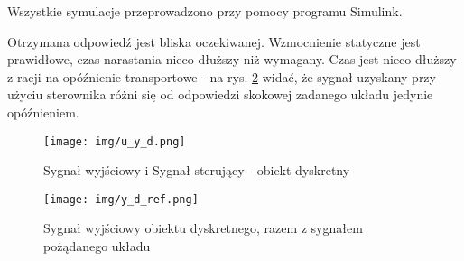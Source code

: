 \documentclass[fleqn]{article}
\newcommand \A {1 - 0.8752 q^{-1}}
\newcommand \B {0.1248}
\newcommand \Bm {3.684}
\newcommand \aOne {-0.8752}
\newcommand \G {0.1594}
\newcommand \R {\B + 0.0227 q^{-1}}
\begin{document}

Wszystkie symulacje przeprowadzono przy pomocy programu Simulink.

Otrzymana odpowiedź jest bliska oczekiwanej. Wzmocnienie statyczne jest prawidłowe, czas narastania nieco dłuższy niż wymagany. Czas jest nieco dłuższy z racji na opóźnienie transportowe - na rys. \ref{fig:y_d_ref} widać, że sygnał uzyskany przy użyciu sterownika różni się od odpowiedzi skokowej zadanego układu jedynie opóźnieniem.
\begin{figure}[H]
    \centering
    \texttt{[image: img/u\_y\_d.png]}
    \caption{Sygnał wyjściowy i Sygnał sterujący - obiekt dyskretny}
    \label{fig:u_y_d}
\end{figure}

\begin{figure}[H]
    \centering
    \texttt{[image: img/y\_d\_ref.png]}
    \caption{Sygnał wyjściowy obiektu dyskretnego, razem z sygnałem pożądanego układu}
    \label{fig:y_d_ref}
\end{figure}

\end{document}
